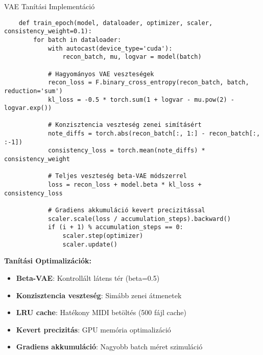 \documentclass[aspectratio=169]{beamer}
\begin{document}
\begin{frame}[fragile]{VAE Tanítási Implementáció}

    \begin{lstlisting}
    def train_epoch(model, dataloader, optimizer, scaler, consistency_weight=0.1):
        for batch in dataloader:
            with autocast(device_type='cuda'):
                recon_batch, mu, logvar = model(batch)
            
            # Hagyományos VAE veszteségek
            recon_loss = F.binary_cross_entropy(recon_batch, batch, reduction='sum')
            kl_loss = -0.5 * torch.sum(1 + logvar - mu.pow(2) - logvar.exp())
            
            # Konzisztencia veszteség zenei simításért
            note_diffs = torch.abs(recon_batch[:, 1:] - recon_batch[:, :-1])
            consistency_loss = torch.mean(note_diffs) * consistency_weight
            
            # Teljes veszteség beta-VAE módszerrel
            loss = recon_loss + model.beta * kl_loss + consistency_loss
            
            # Gradiens akkumuláció kevert precizitással
            scaler.scale(loss / accumulation_steps).backward()
            if (i + 1) % accumulation_steps == 0:
                scaler.step(optimizer)
                scaler.update()
    \end{lstlisting}
    
    \textbf{Tanítási Optimalizációk:}
    \begin{itemize}
        \item \textbf{Beta-VAE}: Kontrollált látens tér (beta=0.5)
        \item \textbf{Konzisztencia veszteség}: Simább zenei átmenetek
        \item \textbf{LRU cache}: Hatékony MIDI betöltés (500 fájl cache)
        \item \textbf{Kevert precizitás}: GPU memória optimalizáció
        \item \textbf{Gradiens akkumuláció}: Nagyobb batch méret szimuláció
    \end{itemize}
    \end{frame}
\end{document}
